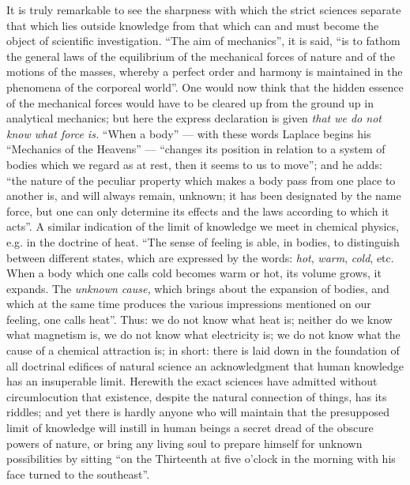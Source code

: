 \documentclass[12pt,a4paper,openany]{book}
\newcommand{\opage}[1]{\marginnote{\footnotesize\textit{[#1]}}}
\begin{document}
It is truly remarkable to see the sharpness
with which the strict sciences separate that which
lies outside knowledge from that which can and must become
the object of scientific investigation. ``The aim
of mechanics'', it is said, ``is to fathom the
\setcounter{footnote}{0}%
\opage{394}general laws of the equilibrium of the mechanical forces of nature
and of the motions of the masses, whereby a perfect
order and harmony is maintained in the phenomena of the corporeal world''.
One would now think that the hidden essence of the mechanical
forces would have to be cleared up from the ground up
in analytical mechanics; but here the express
declaration is given \emph{that we do not know what force is.}
``When a body'' --- with these words Laplace begins
his ``Mechanics of the Heavens'' --- ``changes its position in relation to
a system of bodies which we regard as at rest,
then it seems to us to move''; and he adds: ``the
nature of the peculiar property which makes a body
pass from one place to another is, and will always
remain, unknown; it has been designated by the name
force, but one can only determine its effects and
the laws according to which it acts''. A similar indication
of the limit of knowledge we meet in chemical physics, e.g.
in the doctrine of heat. ``The sense of feeling is able, in bodies,
to distinguish between different states, which
are expressed by the words: \emph{hot}, \emph{warm}, \emph{cold}, etc.
When a body which one calls cold becomes warm
or hot, its volume grows, it expands. The
\emph{unknown cause,} which brings about the expansion of bodies,
and which at the same time produces the various impressions
mentioned on our feeling, one calls heat''.
Thus: we do not know what heat is; neither do we know
what magnetism is, we do not know what electricity
is; we do not know what the cause of a chemical
attraction is; in short: there is laid down in the foundation of all
doctrinal edifices of natural science an acknowledgment
that human knowledge has an insuperable
\setcounter{footnote}{0}%
\opage{395}limit. Herewith the exact sciences have admitted without circumlocution
that existence, despite the natural connection of things, has its riddles; and yet there is hardly
anyone who will maintain that the presupposed limit of knowledge
will instill in human beings a secret dread of the obscure powers of nature, or bring any living soul
to prepare himself for unknown possibilities by sitting
``on the Thirteenth at five o'clock in the morning with his face
turned to the southeast''.
\end{document}
